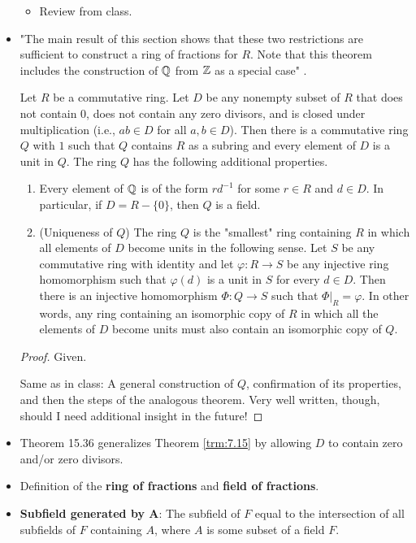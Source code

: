 \documentclass[../notes.tex]{subfiles}
\begin{document}
\begin{itemize}
\begin{itemize}
        \item Review from class.
    \end{itemize}
    \item "The main result of this section shows that these two restrictions are sufficient to construct a ring of fractions for $R$. Note that this theorem includes the construction of $\mathbb{Q}$ from $\mathbb{Z}$ as a special case" \parencite[261]{bib:DummitFoote}.
    \begin{theorem}\label{trm:7.15}
        Let $R$ be a commutative ring. Let $D$ be any nonempty subset of $R$ that does not contain 0, does not contain any zero divisors, and is closed under multiplication (i.e., $ab\in D$ for all $a,b\in D$). Then there is a commutative ring $Q$ with $1$ such that $Q$ contains $R$ as a subring and every element of $D$ is a unit in $Q$. The ring $Q$ has the following additional properties.
        \begin{enumerate}
            \item Every element of $\mathbb{Q}$ is of the form $rd^{-1}$ for some $r\in R$ and $d\in D$. In particular, if $D=R-\{0\}$, then $Q$ is a field.
            \item (Uniqueness of $Q$) The ring $Q$ is the "smallest" ring containing $R$ in which all elements of $D$ become units in the following sense. Let $S$ be any commutative ring with identity and let $\varphi:R\to S$ be any injective ring homomorphism such that $\varphi(d)$ is a unit in $S$ for every $d\in D$. Then there is an injective homomorphism $\Phi:Q\to S$ such that $\Phi|_R=\varphi$. In other words, any ring containing an isomorphic copy of $R$ in which all the elements of $D$ become units must also contain an isomorphic copy of $Q$.
        \end{enumerate}
        \begin{proof}
            Given.\par
            Same as in class: A general construction of $Q$, confirmation of its properties, and then the steps of the analogous theorem. Very well written, though, should I need additional insight in the future!
        \end{proof}
    \end{theorem}
    \item Theorem 15.36 generalizes Theorem \ref{trm:7.15} by allowing $D$ to contain zero and/or zero divisors.
    \item Definition of the \textbf{ring of fractions} and \textbf{field of fractions}.
    \item \textbf{Subfield generated by $\bm{A}$}: The subfield of $F$ equal to the intersection of all subfields of $F$ containing $A$, where $A$ is some subset of a field $F$.

\end{itemize}
\end{document}

